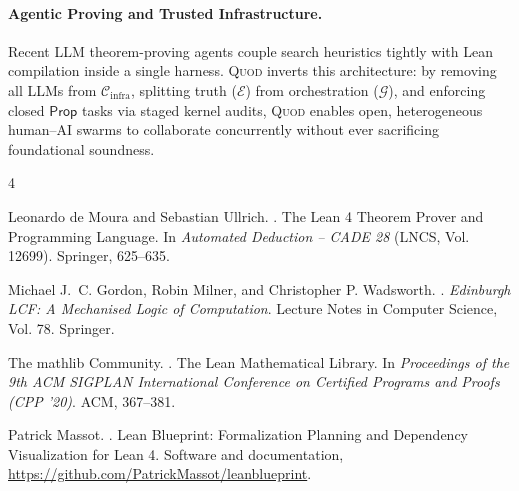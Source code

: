 \documentclass[sigplan,nonacm,10pt]{acmart}
\newcommand{\Cinfra}{\mathcal{C}_{\mathrm{infra}}}
\newcommand{\Truth}{\mathcal{E}}
\newcommand{\Orch}{\mathcal{G}}
\newcommand{\Prop}{\mathsf{Prop}}
\begin{document}
\paragraph{Agentic Proving and Trusted Infrastructure.}
Recent LLM theorem-proving agents couple search heuristics tightly with Lean compilation inside a single harness. \textsc{Quod} inverts this architecture: by removing all LLMs from $\Cinfra$, splitting truth ($\Truth$) from orchestration ($\Orch$), and enforcing closed $\Prop$ tasks via staged kernel audits, \textsc{Quod} enables open, heterogeneous human--AI swarms to collaborate concurrently without ever sacrificing foundational soundness.

\begin{thebibliography}{4}

Leonardo de Moura and Sebastian Ullrich.
.
\newblock The Lean 4 Theorem Prover and Programming Language.
\newblock In \emph{Automated Deduction -- CADE 28} (LNCS, Vol. 12699). Springer, 625--635.

Michael J.~C. Gordon, Robin Milner, and Christopher P. Wadsworth.
.
\newblock \emph{Edinburgh LCF: A Mechanised Logic of Computation}.
\newblock Lecture Notes in Computer Science, Vol. 78. Springer.

The mathlib Community.
.
\newblock The Lean Mathematical Library.
\newblock In \emph{Proceedings of the 9th ACM SIGPLAN International Conference on Certified Programs and Proofs (CPP '20)}. ACM, 367--381.

Patrick Massot.
.
\newblock Lean Blueprint: Formalization Planning and Dependency Visualization for Lean 4.
\newblock Software and documentation, \url{https://github.com/PatrickMassot/leanblueprint}.

\end{thebibliography}
\end{document}
